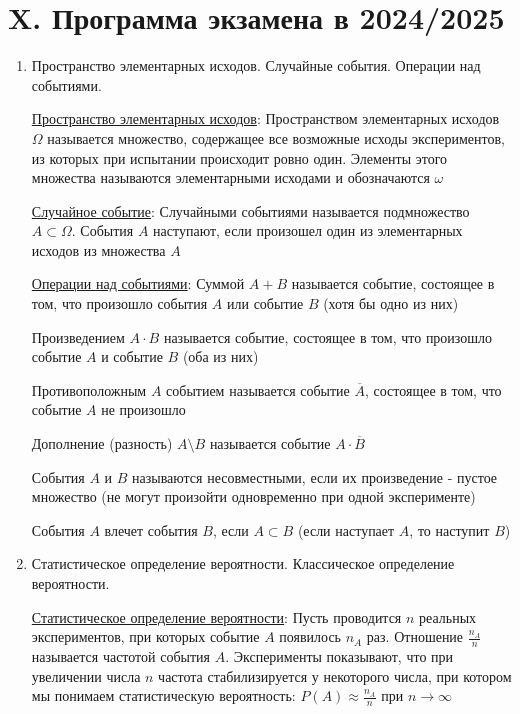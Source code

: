 \clearpage

\section{X. Программа экзамена в 2024/2025}

\begin{enumerate}
    \item Пространство элементарных исходов. Случайные события. Операции над событиями.

    \hyperlink{spaceofelementaryoutcomes}{Пространство элементарных исходов}: Пространством элементарных исходов $\Omega$ называется множество, содержащее все возможные исходы
    экспериментов, из которых при испытании происходит ровно один. Элементы этого множества называются
    элементарными исходами и обозначаются $\omega$

    \hyperlink{randomeventdefinition}{Случайное событие}: Случайными событиями называется подмножество $A \subset \Omega$. События $A$ наступают, если произошел один из
    элементарных исходов из множества $A$

    \hyperlink{randomeventoperations}{Операции над событиями}: Суммой $A + B$ называется событие, состоящее в том, что произошло события $A$ или событие $B$ (хотя бы одно из них)

    Произведением $A \cdot B$ называется событие, состоящее в том, что произошло событие $A$ и событие $B$ (оба из них)

    Противоположным $A$ событием называется событие $\overline{A}$, состоящее в том, что событие $A$ не произошло

    Дополнение (разность) $A \setminus B$ называется событие $A \cdot \overline{B}$

    События $A$ и $B$ называются несовместными, если их произведение - пустое множество
    (не могут произойти одновременно при одной эксперименте)

    События $A$ влечет события $B$, если $A \subset B$ (если наступает $A$, то наступит $B$)

    \item Статистическое определение вероятности. Классическое определение вероятности.

    \hyperlink{statisticaldefinitionofprobability}{Статистическое определение вероятности}: Пусть проводится $n$ реальных экспериментов, при которых событие $A$ появилось $n_A$ раз.
    Отношение $\frac{n_A}{n}$ называется частотой события $A$.
    Эксперименты показывают, что при увеличении числа $n$ частота стабилизируется у некоторого числа,
    при котором мы понимаем статистическую вероятность: $P(A) \approx \frac{n_A}{n}$ при $n \to \infty$


\end{enumerate}
